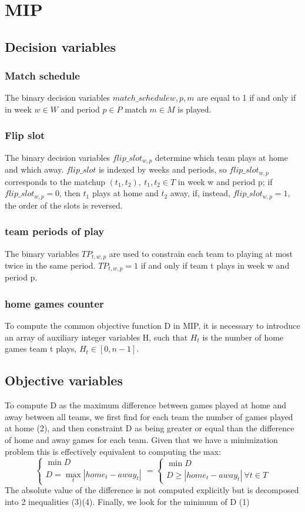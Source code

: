 \section{MIP}
\subsection{Decision variables}
\subsubsection{Match schedule}
The binary decision variables $match\_schedule{w,p,m}$ are equal to 1 if and only if in week $w \in W$ and period $p \in P$ match $m \in M$ is played.

\subsubsection{Flip slot}
The binary decision variables $flip\_slot_{w,p}$ determine which team plays at home and which away. $flip\_slot$ is indexed by weeks and periods, so $flip\_slot_{w,p}$ corresponds to the matchup $(t_1, t_2), \ t_1, t_2 \in T$ in week w and period p; if $flip\_slot_{w,p} = 0$, then $t_1$ plays at home and $t_2$ away, if, instead, $flip\_slot_{w,p} = 1$, the order of the slots is reversed.

\subsubsection{team periods of play}
The binary variables $TP_{t,w,p}$ are used to constrain each team to playing at most twice in the same period. $TP_{t,w,p} = 1$ if and only if team t plays in week w and period p. 

\subsubsection{home games counter}
To compute the common objective function D in MIP, it is necessary to introduce an array of auxiliary integer variables H, such that $H_t$ is the number of home games team t plays, $H_t \in [0, n-1]$.

\subsection{Objective variables}
To compute D as the maximum difference between games played at home and away between all teams, we first find for each team the number of games played at home (2), and then constraint D as being greater or equal than the difference of home and away games for each team. Given that we have a minimization problem this is effectively equivalent to computing the max: $$\begin{cases}
    \min D \\
    D = \max_t |home_t - away_t|
\end{cases} = \begin{cases}
    \min D \\
    D \geq |home_t - away_t| \ \forall t \in T
\end{cases}$$The absolute value of the difference is not computed explicitly but is decomposed into 2 inequalities (3)(4). Finally, we look for the minimum of D (1)

